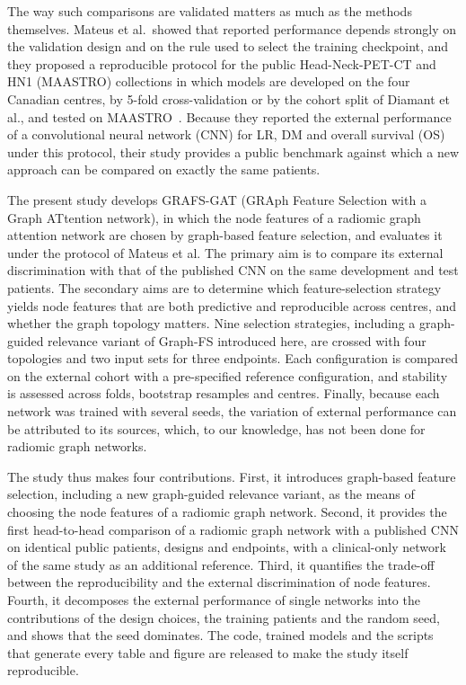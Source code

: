 \documentclass[11pt,a4paper]{article}
\newcommand{\method}{GRAFS-GAT}
\begin{document}
The way such comparisons are validated matters as much as the methods themselves. Mateus et al.\ showed that reported performance depends strongly on the validation design and on the rule used to select the training checkpoint, and they proposed a reproducible protocol for the public Head-Neck-PET-CT and HN1 (MAASTRO) collections in which models are developed on the four Canadian centres, by 5-fold cross-validation or by the cohort split of Diamant et al., and tested on MAASTRO~\cite{mateus2023,diamant2019}. Because they reported the external performance of a convolutional neural network (CNN) for LR, DM and overall survival (OS) under this protocol, their study provides a public benchmark against which a new approach can be compared on exactly the same patients.

The present study develops \method{} (GRAph Feature Selection with a Graph ATtention network), in which the node features of a radiomic graph attention network are chosen by graph-based feature selection, and evaluates it under the protocol of Mateus et al. The primary aim is to compare its external discrimination with that of the published CNN on the same development and test patients. The secondary aims are to determine which feature-selection strategy yields node features that are both predictive and reproducible across centres, and whether the graph topology matters. Nine selection strategies, including a graph-guided relevance variant of Graph-FS introduced here, are crossed with four topologies and two input sets for three endpoints. Each configuration is compared on the external cohort with a pre-specified reference configuration, and stability is assessed across folds, bootstrap resamples and centres. Finally, because each network was trained with several seeds, the variation of external performance can be attributed to its sources, which, to our knowledge, has not been done for radiomic graph networks.

The study thus makes four contributions. First, it introduces graph-based feature selection, including a new graph-guided relevance variant, as the means of choosing the node features of a radiomic graph network. Second, it provides the first head-to-head comparison of a radiomic graph network with a published CNN on identical public patients, designs and endpoints, with a clinical-only network of the same study as an additional reference. Third, it quantifies the trade-off between the reproducibility and the external discrimination of node features. Fourth, it decomposes the external performance of \vcNmodels{} single networks into the contributions of the design choices, the training patients and the random seed, and shows that the seed dominates. The code, trained models and the scripts that generate every table and figure are released to make the study itself reproducible.
\end{document}
